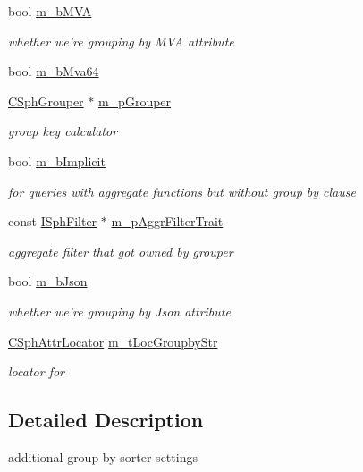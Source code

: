 \begin{DoxyCompactItemize}
bool \hyperlink{structCSphGroupSorterSettings_ac863dda0135c99dafcad40707d1301f7}{m\-\_\-b\-M\-V\-A}
\begin{DoxyCompactList}\small\item\em whether we're grouping by M\-V\-A attribute \end{DoxyCompactList}\item 
bool \hyperlink{structCSphGroupSorterSettings_a6df446a75ac8695a79549585708c43b3}{m\-\_\-b\-Mva64}
\item 
\hyperlink{classCSphGrouper}{C\-Sph\-Grouper} $\ast$ \hyperlink{structCSphGroupSorterSettings_af976f035f4367a4ec872d85c16c1a83d}{m\-\_\-p\-Grouper}
\begin{DoxyCompactList}\small\item\em group key calculator \end{DoxyCompactList}\item 
bool \hyperlink{structCSphGroupSorterSettings_a291e71d39fac0fc98b0392d81e42343f}{m\-\_\-b\-Implicit}
\begin{DoxyCompactList}\small\item\em for queries with aggregate functions but without group by clause \end{DoxyCompactList}\item 
const \hyperlink{structISphFilter}{I\-Sph\-Filter} $\ast$ \hyperlink{structCSphGroupSorterSettings_aa5f8d2e3257a5a814ff144f78fde90d7}{m\-\_\-p\-Aggr\-Filter\-Trait}
\begin{DoxyCompactList}\small\item\em aggregate filter that got owned by grouper \end{DoxyCompactList}\item 
bool \hyperlink{structCSphGroupSorterSettings_a62e864860985d58566bfe3891aeaad59}{m\-\_\-b\-Json}
\begin{DoxyCompactList}\small\item\em whether we're grouping by Json attribute \end{DoxyCompactList}\item 
\hyperlink{structCSphAttrLocator}{C\-Sph\-Attr\-Locator} \hyperlink{structCSphGroupSorterSettings_af5b5313a9a0042996f5d9723d0559189}{m\-\_\-t\-Loc\-Groupby\-Str}
\begin{DoxyCompactList}\small\item\em locator for  \end{DoxyCompactList}\end{DoxyCompactItemize}


\subsection{Detailed Description}
additional group-\/by sorter settings 


